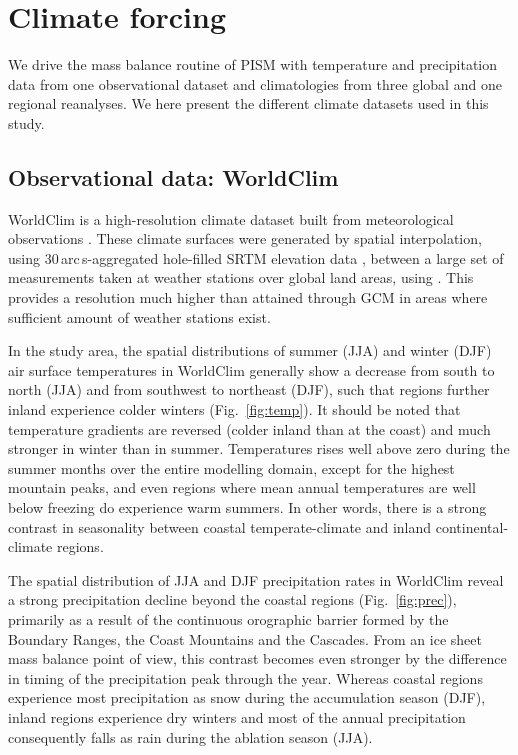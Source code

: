 \section{Climate forcing}
\label{sec:climate}

We drive the mass balance routine of PISM with temperature and precipitation data from one observational dataset and climatologies from three global and one regional reanalyses. We here present the different climate datasets used in this study.

\subsection{Observational data: WorldClim}

WorldClim is a high-resolution climate dataset built from meteorological observations \citep{data:worldclim}. These climate surfaces were generated by spatial interpolation, using 30\,arc\,s-aggregated hole-filled SRTM elevation data \citep{jarvis-etal-2008}, between a large set of measurements taken at weather stations over global land areas, using . This provides a resolution much higher than attained through GCM in areas where sufficient amount of weather stations exist.

 In the study area, the spatial distributions of summer (JJA) and winter (DJF) air surface temperatures in WorldClim generally show a decrease from south to north (JJA) and from southwest to northeast (DJF), such that regions further inland experience colder winters (Fig.~\ref{fig:temp}). It should be noted that temperature gradients are reversed (colder inland than at the coast) and much stronger in winter than in summer. Temperatures rises well above zero during the summer months over the entire modelling domain, except for the highest mountain peaks, and even regions where mean annual temperatures are well below freezing do experience warm summers. In other words, there is a strong contrast in seasonality between coastal temperate-climate and inland continental-climate regions.

The spatial distribution of JJA and DJF precipitation rates in WorldClim reveal a strong precipitation decline beyond the coastal regions (Fig.~\ref{fig:prec}), primarily as a result of the continuous orographic barrier formed by the Boundary Ranges, the Coast Mountains and the Cascades. From an ice sheet mass balance point of view, this contrast becomes even stronger by the difference in timing of the precipitation peak through the year. Whereas coastal regions experience most precipitation as snow during the accumulation season (DJF), inland regions experience dry winters and most of the annual precipitation consequently falls as rain during the ablation season (JJA).

